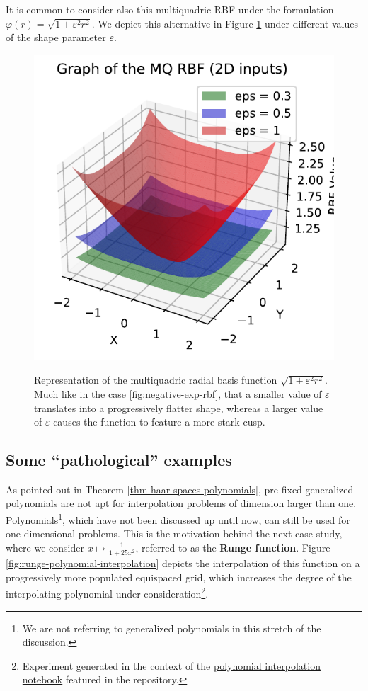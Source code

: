 \documentclass[12pt]{report} %
\newcommand{\tmstrong}[1]{\textbf{#1}}
\begin{document}
It is common to consider also this multiquadric RBF under the formulation
$\varphi (r) = \sqrt{1 + \varepsilon^2 r^2}$. We depict this alternative in
Figure \ref{fig:mq-rbf} under different values of the shape parameter
$\varepsilon$.

\begin{figure}[ht]
    \centering
    {\includegraphics[width=.5\textwidth, clip=true, trim={0 0 .17cm 0}]{imagenes/rbf_discussion/mq-rbf.pdf}}
    \caption{Representation of the multiquadric radial basis function $\sqrt{1+\varepsilon^2 r^2}$. Much like in the case \ref{fig:negative-exp-rbf}, that a smaller value of $\varepsilon$ translates into a progressively flatter shape, whereas a larger value of $\varepsilon$ causes the function to feature a more stark cusp.}
    \label{fig:mq-rbf}
\end{figure}

\subsection*{Some ``pathological'' examples}

As pointed out in Theorem \ref{thm-haar-spaces-polynomials}, pre-fixed
generalized polynomials are not apt for interpolation problems of
dimension larger than one. Polynomials\footnote{We are not referring to generalized polynomials in this stretch of the discussion.}, which
have not been discussed up until now, can still be used for one-dimensional
problems. This is the motivation behind the next case study, where we consider
$x \mapsto \frac{1}{1 + 25 x^2}$, referred to as the {\tmstrong{Runge
function}}. Figure \ref{fig:runge-polynomial-interpolation} depicts the
interpolation of this function on a progressively more populated equispaced
grid, which increases the degree of the interpolating polynomial under consideration\footnote{Experiment generated in the context of the \href{https://github.com/heqro/tfm-experiments/blob/main/introductory_notebooks/polynomial_interpolation/runge.ipynb}{polynomial interpolation notebook} featured in the repository.}. 
\end{document}
